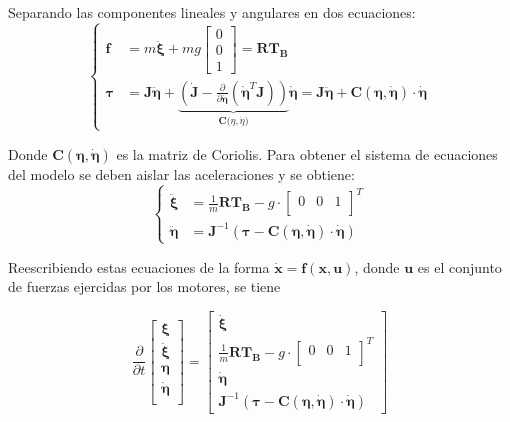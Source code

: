 \documentclass[twoside,11pt]{book}
\begin{document}
Separando las componentes lineales y angulares en dos ecuaciones:
\begin{equation}
\begin{cases}
\pmb{f} & = m \pmb{\ddot{\xi}} + mg \left[ \begin{array}{c}
0 \\
0 \\
1
\end{array} \right] =\pmb{R}\pmb{T_B} \\
\pmb{\tau} & =\pmb{J} \pmb{\ddot{\eta}} +  \underbrace{\left( \pmb{\dot{J}} - \frac{\partial}{\partial \pmb{\dot{\eta}}}(\pmb{\dot{\eta}}^{T}\pmb{J})\right)}_{\pmb{C(}\eta,\dot{\eta}\pmb{)}} \pmb{\dot{\eta}} =\pmb{J} \pmb{\ddot{\eta}} +  \pmb{C(\eta,\dot{\eta})}\cdot\pmb{\dot{\eta}} 
\end{cases}
\label{3.24}
\end{equation}

Donde $\pmb{C(\eta,\dot{\eta})}$ es la matriz de Coriolis. 
Para obtener el sistema de ecuaciones del modelo se deben aislar las aceleraciones y se obtiene:
\begin{equation}
\begin{cases}
\pmb{\ddot{\xi}} & =\frac{1}{m}\pmb{R}\pmb{T_{B}} - g \cdot \left[ \begin{array}{ccc}
0 & 0 & 1\\
\end{array} \right]^{T} \\
\pmb{\ddot{\eta}} & =\pmb{J}^{-1} \left( \pmb{\tau} - \pmb{C(\eta,\dot{\eta})}\cdot\pmb{\dot{\eta}}  \right)
\end{cases}
\label{eq:system}
\end{equation}

Reescribiendo estas ecuaciones de la forma $\pmb{\dot{x}}=\pmb{f(x,u)}$, donde $\pmb{u}$ es el conjunto de fuerzas ejercidas por los motores, se tiene 

\begin{equation}
\frac{\partial}{\partial t}\left[ \begin{array}{l}
\pmb{\xi} \\
\pmb{\dot{\xi}} \\
\pmb{\eta} \\
\pmb{\dot{\eta}} \\
\end{array} \right] =\left[ \begin{array}{l}
\pmb{\dot{\xi}} \\
\frac{1}{m}\pmb{R}\pmb{T_{B}} - g \cdot \left[ \begin{array}{ccc}
0 & 0 & 1 \\
\end{array} \right]^{T} \\
\pmb{\dot{\eta}} \\
\pmb{J}^{-1} \left( \pmb{\tau} - \pmb{C(\eta,\dot{\eta})}\cdot\pmb{\dot{\eta}} \right)
\end{array} \right]
\label{eq:system2}
\end{equation}
\end{document}
